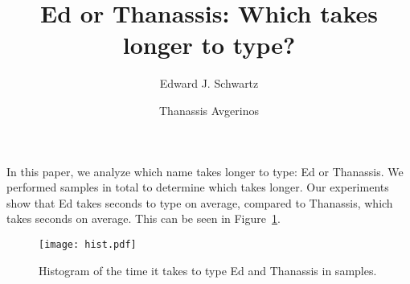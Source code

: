 \documentclass{article}
\author{Edward J. Schwartz \and Thanassis Avgerinos}
\title{Ed or Thanassis: Which takes longer to type?}
\begin{document}
\maketitle

In this paper, we analyze which name takes longer to type: Ed or
Thanassis.  We performed \numsamples samples in total to determine
which takes longer.  Our experiments show that Ed takes \edmean
seconds to type on average, compared to Thanassis, which takes
\thanassismean seconds on average.  This can be seen in
Figure~\ref{fig:hist}.

\begin{figure}
\texttt{[image: hist.pdf]}
\caption{Histogram of the time it takes to type Ed and Thanassis in
  \numsamples samples.}
\label{fig:hist}
\end{figure}
\end{document}
